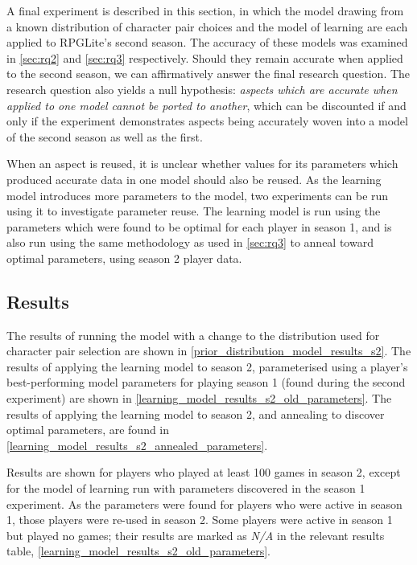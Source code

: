 A final experiment is described in this section, in which the model drawing from
a known distribution of character pair choices and the model of learning are
each applied to RPGLite's second season. The accuracy of these models was
examined in \cref{sec:rq2} and \cref{sec:rq3} respectively. Should they remain
accurate when applied to the second season, we can affirmatively answer the
final research question. The research question also yields a null hypothesis:
\emph{aspects which are accurate when applied to one model cannot be ported to
another}, which can be discounted if and only if the experiment
demonstrates aspects being accurately woven into a model of the second season as
well as the first. 

When an aspect is reused, it is unclear whether values for its parameters which
produced accurate data in one model should also be reused. As the learning model
introduces more parameters to the model, two experiments can be run using it to
investigate parameter reuse. The learning model is run using the parameters
which were found to be optimal for each player in season 1, and is also run
using the same methodology as used in \cref{sec:rq3} to anneal toward optimal
parameters, using season 2 player data.


\subsection{Results}

The results of running the model with a change to the distribution used for
character pair selection are shown in
\cref{prior_distribution_model_results_s2}. The results of applying the learning
model to season 2, parameterised using a player's best-performing model
parameters for playing season 1 (found during the second experiment) are shown
in \cref{learning_model_results_s2_old_parameters}. The results of applying the
learning model to season 2, and annealing to discover optimal parameters, are
found in \cref{learning_model_results_s2_annealed_parameters}.

Results are shown for players who played at least 100 games in season 2, except
for the model of learning run with parameters discovered in the season 1
experiment. As the parameters were found for players who were active in season
1, those players were re-used in season 2. Some players were active in season 1
but played no games; their results are marked as \emph{N/A} in the relevant
results table, \cref{learning_model_results_s2_old_parameters}.

